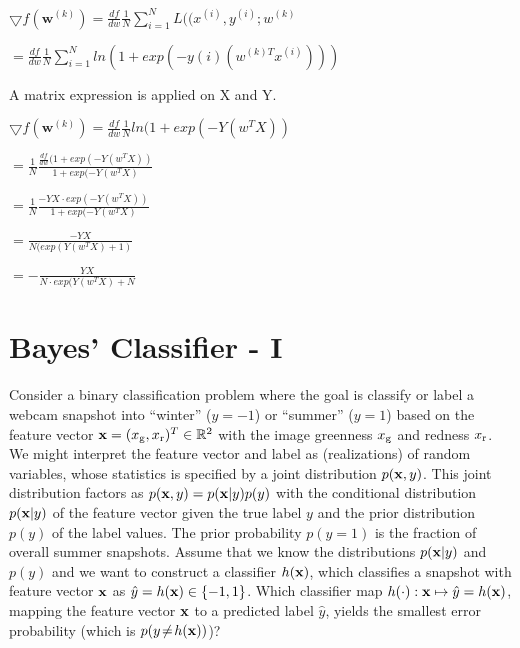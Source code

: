 \documentclass[article,11pt]{article}
\begin{document}
$\bigtriangledown f(\textbf{w}^{(k)}) = \frac{df}{dw}\frac{1}{N}\sum\limits^N_{i=1}L((x^{(i)},y^{(i)}; w^{(k)}$\vspace{5mm}

$= \frac{df}{dw}\frac{1}{N}\sum\limits^N_{i=1}ln(1+exp(-y(i)(w^{(k)T}x^{(i)})))$\vspace{5mm}

A matrix expression is applied on X and Y.\vspace{5mm}

$\bigtriangledown f(\textbf{w}^{(k)}) =\frac{df}{dw}\frac{1}{N}ln(1+exp(- Y (w^T X))$\vspace{5mm}

$=\frac{1}{N} \frac{\frac{df}{dw}(1+exp(- Y (w^T X))}{1+exp(- Y (w^T X)}$\vspace{5mm}

$=\frac{1}{N} \frac{-YX \cdot exp(- Y (w^T X))}{1+exp(- Y (w^T X)}$\vspace{5mm}

$=\frac{-YX}{N(exp(Y (w^T X)+1)}$\vspace{5mm}

$=-\frac{YX}{N \cdot exp(Y (w^T X)+N}$\vspace{5mm}

\flushleft
\newpage

\section{Bayes' Classifier - I}
Consider a binary classification problem where the goal is classify or label a webcam snapshot into ``winter'' ($y=-1$) or ``summer'' ($y=1$) based on the feature vector 
${\bf x}=(x_{\rm g},x_{\rm r})^{T} \in \mathbb{R}^{2}$ with the image greenness $x_{\rm g}$ and redness $x_{\rm r}$. We might interpret 
the feature vector and label as (realizations) of random variables, whose statistics is specified by a joint distribution $p({\bf x},y)$. This joint distribution factors as $p({\bf x},y) = p({\bf x}| y) p(y)$ 
with the conditional distribution $p({\bf x}| y)$ of the feature vector given the true label $y$ and the prior distribution $p(y)$ of the label values. The prior probability $p(y=1)$ is the fraction of overall 
summer snapshots. Assume that we know the distributions $p({\bf x}| y)$ and $p(y)$ and we want to construct a classifier $h({\bf x})$, which classifies a snapshot with feature vector ${\bf x}$ as $\hat{y}=h({\bf x}) \in \{-1,1\}$. 
Which classifier map $h(\cdot): {\bf x} \mapsto \hat{y}=h({\bf x})$, mapping the feature vector ${\bf x}$ to a predicted label $\hat{y}$, yields the smallest error probability (which is $p( y \!\neq\! h({\bf x}))$)? 
 
\end{document}
